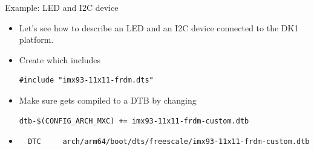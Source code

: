 \begin{frame}[fragile]{Example: LED and I2C device}
  \begin{itemize}
  \item Let's see how to describe an LED and an I2C device connected
    to the DK1 platform.
  \item Create 
    which includes 
    \begin{block}{}
{\tiny
\begin{verbatim}
#include "imx93-11x11-frdm.dts"
\end{verbatim}
}
    \end{block}
  \item Make sure  gets compiled to a
    DTB by changing 
    \begin{block}{}
      {\tiny
\begin{verbatim}
dtb-$(CONFIG_ARCH_MXC) += imx93-11x11-frdm-custom.dtb
\end{verbatim}
      }
    \end{block}
  \item {}
    \begin{block}{}
      {\tiny
\begin{verbatim}
  DTC     arch/arm64/boot/dts/freescale/imx93-11x11-frdm-custom.dtb
\end{verbatim}
      }
    \end{block}
  \end{itemize}
\end{frame}


